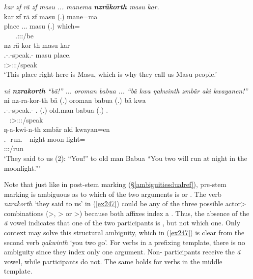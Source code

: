 \begin{exe}
	\ex \emph{kar zf rä zf masu ... manema \textbf{nzräkorth} masu kar.}\\
	\glll kar zf rä zf masu (.) mane=ma\\
	place {\Imm} \Tsg.\F.\Cop.{\Ndu} {\Imm} masu (.) which={\Char}\\
	~ ~ {\footnotesize \Tsg.\F:\Sbj:\Nonpast:\Ipfv/be} ~ ~ ~ ~\\
	\sn
	\glll
	nz-rä-kor-th masu kar\\
	\Fnsg.\Bet-\Irr.\Ndu-speak.\Rs-\Stnsg{} masu place.\\
	{\footnotesize \Stpl:\Sbj>\Fpl:\Obj:\Irr:\Pfv/speak} ~ ~\\
	\trans `This place right here is Masu, which is why they call us Masu people.'\\ 
	\label{ex250}
\end{exe}
\begin{exe}
	\ex \emph{ni \textbf{nzrakorth} ``bä!'' ... oroman babua ... ``bä kwa ŋakwinth zmbär aki kwayanen!''}\\
	\glll ni nz-ra-kor-th bä (.) oroman babua (.) bä kwa\\
	{\Fnsg} \Fnsg.\Bet-\Irr.\Du-speak.\Rs-\Stnsg{} \Second.{\Abs} (.) old.man babua (.) \Second.{\Abs} {\Fut}\\
	~ {\footnotesize \Stpl:\Sbj>\Fdu:\Obj:\Irr:\Pfv/speak} ~ ~ ~ ~ ~ ~ ~\\
	\sn
	\glll ŋ-a-kwi-n-th zmbär aki kwayan=en\\
	\M.\Alph-\Vc-run.\Ext-\Du-\Stnsg{} night moon light=\Loc\\
	{\footnotesize \Stdu:\Sbj:\Nonpast:\Ipfv/run} ~ ~ ~\\
	\trans `They said to us (2): ``You!'' to old man Babua ``You two will run at night in the moonlight.''' 
	\label{ex247}
\end{exe}

Note that just like in post-stem  marking ({\S}\ref{ambiguitiesdualref}), pre-stem  marking is ambiguous as to which of the two arguments is  or . The verb \emph{nzrakorth} `they said to us' in (\ref{ex247}) could be any of the three possible actor> combinations (\Pl>\Du, \Du>{\Du} or \Du>\Pl) because both  affixes index a  . Thus, the absence of the \emph{ä} vowel indicates that one of the two participants is , but not which one. Only context may solve this structural ambiguity, which in (\ref{ex247}) is clear from the second verb \emph{ŋakwinth} `you two go'. For verbs in a prefixing template, there is no ambiguity since they index only one argument. Non- participants receive the \emph{ä} vowel, while  participants do not. The same holds for verbs in the middle template.

